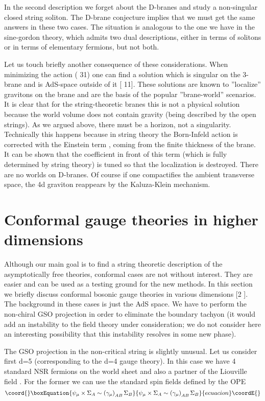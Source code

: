 \documentclass[a4paper,12pt]{article}
\begin{document}
In the second description we forget about the D-branes and study a
non-singular closed string soliton. The D-brane conjecture implies that we
must get the same answers in these two cases. The situation is analogous to
the one we have in the sine-gordon theory, which admits two dual
descriptions, either in terms of solitons or in terms of elementary
fermions, but not both.

Let us touch briefly another consequence of these considerations. When
minimizing the action ( 31) one can find a solution which is singular on the
3-brane and is AdS-space outside of it [ 11]. These solutions are known to
''localize'' gravitons on the brane and are the basis of the popular
''brane-world'' scenarios. It is clear that for the string-theoretic branes
this is not a physical solution because the world volume does not contain
gravity (being described by the open strings). As we argued above, there
must be a horizon, not a singularity. Technically this happens because in
string theory the Born-Infeld action is corrected with the Einstein term \coordHE{} , coming from the finite thickness of the
brane. It can be shown that the coefficient in front of this term (which is
fully determined by string theory) is tuned so that the localization is
destroyed. There are no worlds on D-branes. Of course if one compactifies
the ambient transverse space, the 4d graviton reappears by the Kaluza-Klein
mechanism.

\section{Conformal gauge theories in higher dimensions}

Although our main goal is to find a string theoretic description of the
asymptotically free theories, conformal cases are not without interest. They
are easier and can be used as a testing ground for the new methods. In this
section we briefly discuss conformal bosonic gauge theories in various
dimensions [2 ]. The background in these cases is just the AdS space. We
have to perform the non-chiral GSO projection in order to eliminate the
boundary tachyon (it would add an instability to the field theory under
consideration; we do not consider here an interesting possibility that this
instability resolves in some new phase).

The GSO projection in the non-critical string is slightly unusual. Let us
consider first d=5 (corresponding to the d=4 gauge theory). In this case we
have 4 standard NSR fermions \myHighlight{$\psi _{\mu }$}\coordHE{} on the world sheet and also a
partner of the Liouville field \coordHE{}. For the former we can use the
standard spin fields defined by the OPE 
\begin{equation}\coord{}\boxEquation{
\psi _{\mu }\times \Sigma _{A}\sim \left( \gamma _{\mu }\right) _{AB}\Sigma
_{B}
}{
\psi _{\mu }\times \Sigma _{A}\sim \left( \gamma _{\mu }\right) _{AB}\Sigma
_{B}
}{ecuacion}\coordE{}\end{equation}
\end{document}
